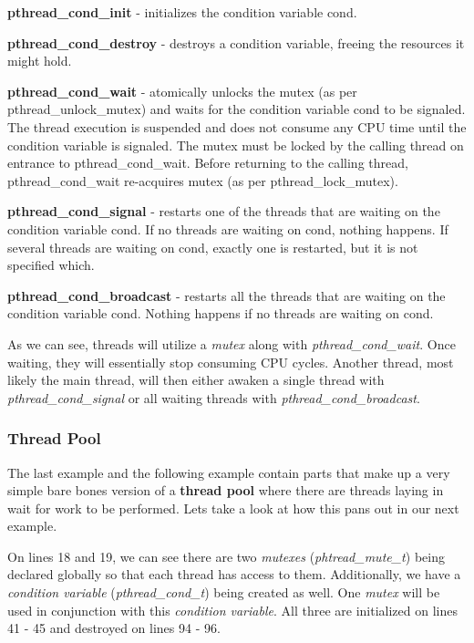 \documentclass[../main.tex]{subfiles}
\begin{document}
	\textbf{pthread\_cond\_init} - initializes the condition variable cond.
		
	\textbf{pthread\_cond\_destroy} - destroys a condition variable, freeing the resources it might hold.
		
	\textbf{pthread\_cond\_wait} - atomically unlocks the mutex (as per pthread\_unlock\_mutex) and waits for the condition variable cond to be signaled. The thread execution is suspended and does not consume any  CPU	time  until the condition variable is signaled. The mutex must be locked by the calling thread on entrance to pthread\_cond\_wait. Before returning to the calling thread, pthread\_cond\_wait re-acquires mutex (as per pthread\_lock\_mutex).
		
	\textbf{pthread\_cond\_signal} - restarts  one of the threads that are waiting on the condition variable cond. If no threads are waiting on cond, nothing happens. If several threads are waiting on cond, exactly one is restarted, but it is not specified which.
		
	\textbf{pthread\_cond\_broadcast} - restarts all the threads that are waiting on the condition variable cond. Nothing happens if no threads are waiting on cond.

	As we can see, threads will utilize a \textit{mutex} along with \textit{pthread\_cond\_wait}.  Once waiting, they will essentially stop consuming CPU cycles.  Another thread, most likely the main thread, will then either awaken a single thread with \textit{pthread\_cond\_signal} or all waiting threads with \textit{pthread\_cond\_broadcast}.
	
	\subsubsection{Thread Pool}
	The last example and the following example contain parts that make up a very simple bare bones version of a \textbf{thread pool} where there are threads laying in wait for work to be performed.  Lets take a look at how this pans out in our next example. \\
	
	
	On lines 18 and 19, we can see there are two \textit{mutexes} (\textit{phtread\_mute\_t}) being declared globally so that each thread has access to them.  Additionally, we have a \textit{condition variable} (\textit{pthread\_cond\_t}) being created as well.  One \textit{mutex} will be used in conjunction with this \textit{condition variable}. All three are initialized on lines 41 - 45 and destroyed on lines 94 - 96.
	
\end{document}
